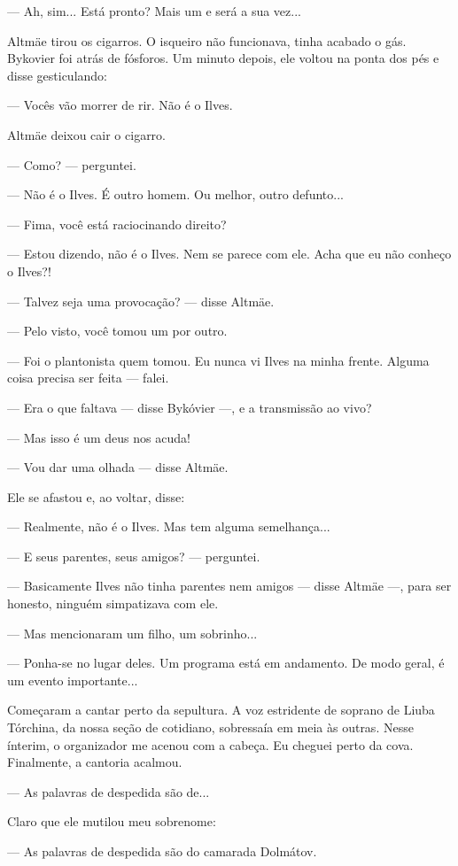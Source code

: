 --- Ah, sim... Está pronto? Mais um e será a sua vez...

Altmäe tirou os cigarros. O isqueiro não funcionava, tinha acabado o
gás. Bykovier foi atrás de fósforos. Um minuto depois, ele voltou na
ponta dos pés e disse gesticulando:

--- Vocês vão morrer de rir. Não é o Ilves.

Altmäe deixou cair o cigarro.

--- Como? --- perguntei.

--- Não é o Ilves. É outro homem. Ou melhor, outro defunto...

--- Fima, você está raciocinando direito?

--- Estou dizendo, não é o Ilves. Nem se parece com ele. Acha que eu não
conheço o Ilves?!

--- Talvez seja uma provocação? --- disse Altmäe.

--- Pelo visto, você tomou um por outro.

--- Foi o plantonista quem tomou. Eu nunca vi Ilves na minha frente.
Alguma coisa precisa ser feita --- falei.

--- Era o que faltava --- disse Bykóvier ---, e a transmissão ao vivo?

--- Mas isso é um deus nos acuda!

--- Vou dar uma olhada --- disse Altmäe.

Ele se afastou e, ao voltar, disse:

--- Realmente, não é o Ilves. Mas tem alguma semelhança...

--- E seus parentes, seus amigos? --- perguntei.

--- Basicamente Ilves não tinha parentes nem amigos --- disse Altmäe
---, para ser honesto, ninguém simpatizava com ele.

--- Mas mencionaram um filho, um sobrinho...

--- Ponha-se no lugar deles. Um programa está em andamento. De modo
geral, é um evento importante...

Começaram a cantar perto da sepultura. A voz estridente de soprano de
Liuba Tórchina, da nossa seção de cotidiano, sobressaía em meia às
outras. Nesse ínterim, o organizador me acenou com a cabeça. Eu cheguei
perto da cova. Finalmente, a cantoria acalmou.

--- As palavras de despedida são de...

Claro que ele mutilou meu sobrenome:

--- As palavras de despedida são do camarada Dolmátov.

